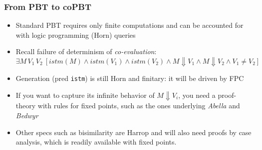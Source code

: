 \documentclass{beamer}
\newcommand{\red}[1]{{\color{red} #1}}
\begin{document}

\begin{frame}
  \frametitle{From PBT to coPBT}
  \begin{itemize}
  \item Standard PBT requires only finite computations and can be accounted for with logic programming (Horn) queries
  \item Recall failure of determinism of \emph{co-evaluation}:
    $\exists M\, V_1\, V_2\ [istm(M) \land istm( V_1) \land istm(V_2) \land M\Downarrow V_1\land M\Downarrow V_2 \land V_1 \not = V_2 ]$
    \item Generation (pred \texttt{istm}) is still Horn and finitary: it will be driven by FPC
      
    \item If you want to capture its
      \red{infinite} behavior of  $ M\Downarrow V_i$, you need a proof-theory with rules for
      fixed points, such as the ones underlying \emph{Abella} and
      \emph{Bedwyr}%
    \item Other specs such as bisimilarity are Harrop and will also need proofs by \red{case analysis}, which is readily available with fixed points.

  \end{itemize}
\end{frame}
\end{document}
